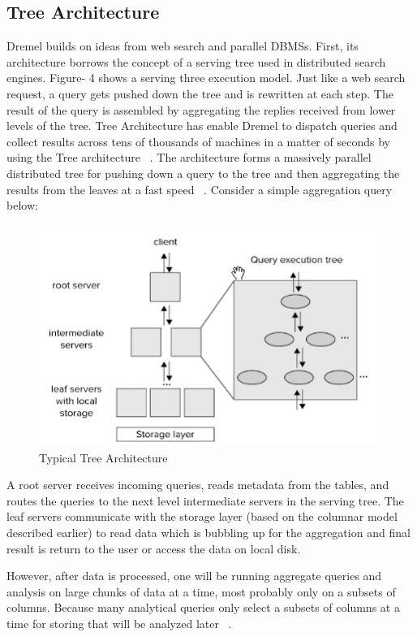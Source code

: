 \documentclass[9pt,twocolumn,twoside]{../../styles/osajnl}
\begin{document}
\subsection{Tree Architecture}
Dremel builds on ideas from web search and parallel DBMSs. First, its architecture borrows the concept of a serving tree used in distributed search engines. Figure- 4 shows a serving three execution model. Just like a web search request, a query gets pushed down the tree and is rewritten at each step. The result of the query is assembled by aggregating the replies received from lower levels of the tree. Tree Architecture has enable Dremel to dispatch queries and collect results across tens of thousands of machines in a matter of seconds by using the Tree architecture ~\cite{book2-hadoop}. The architecture forms a massively parallel distributed tree for pushing down a query to the tree and then aggregating the results from the leaves at a fast speed ~\cite{twitter-dremel}. Consider a simple aggregation query below:

\begin{figure}[H]
 \centering
\includegraphics[scale=0.7]{images/image4}
\caption{Typical Tree Architecture ~\cite{book-hadoop}} 
\end{figure}

A root server receives incoming queries, reads metadata from the tables, and routes the queries to the next level intermediate servers in the serving tree. The leaf servers communicate with the storage layer (based on the columnar model described earlier) to read data which is bubbling up for the aggregation and final result is return to the user  or access the data on local disk. 

However, after data is processed, one will be running aggregate queries and analysis on large chunks of data at a time, most probably only on a subsets of columns. Because many analytical queries only select a subsets of columns at a time for storing that will be analyzed later ~\cite{book-hadoop}.
\end{document}
